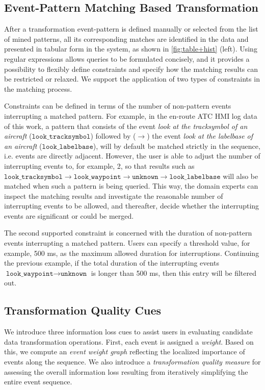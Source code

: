 \documentclass[camera]{vgtc}                          %
\begin{document}
\subsection{Event-Pattern Matching Based Transformation}
\label{sec:match}
After a transformation event-pattern is defined manually or selected from the list of mined patterns, all its corresponding matches are identified in the data and presented in tabular form in the system, as shown in \autoref{fig:table+hist} (left).
Using regular expressions allows queries to be formulated concisely, and it provides a possibility to flexibly define constraints and specify how the matching results can be restricted or relaxed. We support the application of two types of constraints in the matching process. 

Constraints can be defined in terms of the number of non-pattern events interrupting a matched pattern. 
For example, in the en-route ATC HMI log data of this work, a pattern that consists of the event \textit{look at the tracksymbol of an aircraft} ($ \texttt{look\_tracksymbol} $) followed by ($ \rightarrow $) the event \textit{look at the labelbase of an aircraft} ($ \texttt{look\_labelbase} $), will by default be matched strictly in the sequence, i.e. events are directly adjacent. However, the user is able to adjust the number of interrupting events to, for example, 2, so that results such as $ \texttt{look\_tracksymbol} \rightarrow  \texttt{look\_waypoint}  \rightarrow \texttt{unknown} \rightarrow \texttt{look\_labelbase} $ will also be matched when such a pattern is being queried. 
This way, the domain experts can inspect the matching results and investigate the reasonable number of interrupting events to be allowed, and thereafter, decide whether the interrupting events are significant or could be merged.

The second supported constraint is concerned with the duration of non-pattern events interrupting a matched pattern.
Users can specify a threshold value, for example, 500 ms, as the maximum allowed duration for interruptions. Continuing the previous example, if the total duration of the interrupting events $ \texttt{look\_waypoint} \rightarrow \texttt{unknown} $ is longer than 500 ms, then this entry will be filtered out.

\subsection{Transformation Quality Cues}
\label{sec:quality-cues}
We introduce three information loss cues to assist users in evaluating candidate data transformation operations.
First, each event is assigned a \textit{weight}. 
Based on this, we compute an \textit{event weight graph} reflecting the localized importance of events along the sequence.
We also introduce a \textit{transformation quality measure} for assessing the overall information loss resulting from iteratively simplifying the entire event sequence. 
\end{document}
